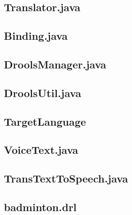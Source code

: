 \documentclass{kuisthesis}			%
\begin{document}
\subsection{Translator.java}


\subsection{Binding.java}


\subsection{DroolsManager.java}


\subsection{DroolsUtil.java}


\subsection{TargetLanguage}


\subsection{VoiceText.java}


\subsection{TransTextToSpeech.java}


\subsection{badminton.drl}

\end{document}
